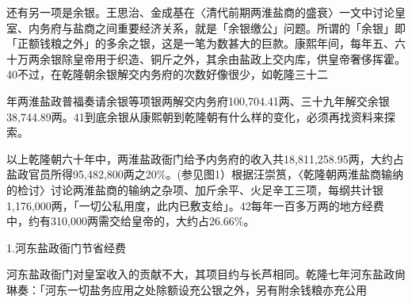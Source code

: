 还有另一项是余银。王思治、金成基在〈清代前期两淮盐商的盛衰〉一文中讨论皇室、内务府与盐商之间重要经济关系，就是「余银缴公」问题。所谓的「余银」即「正额钱粮之外」的多余之银，这是一笔为数甚大的巨款。康熙年间，每年五、六十万两余银除皇帝用于织造、铜斤之外，其余由盐政上交内库，供皇帝奢侈挥霍。40不过，在乾隆朝余银解交内务府的次数好像很少，如乾隆三十二

\vfill
\begin{BookNotes}
\end{BookNotes}

\noindent 年两淮盐政普福奏请余银等项银两解交内务府100,704.41两、三十九年解交余银38,744.89两。41到底余银从康熙朝到乾隆朝有什么样的变化，必须再找资料来探索。

以上乾隆朝六十年中，两淮盐政衙门给予内务府的收入共18,811,258.95两，大约占盐政官员所得95,482,800两之20\%。(参见图1）根据汪崇筼，〈乾隆朝两淮盐商输纳的检讨〉讨论两淮盐商的输纳之杂项、加斤余平、火足辛工三项，每纲共计银1,176,000两，「一切公私用度，此内已敷支给」。42每年一百多万两的地方经费中，约有310,000两需交给皇帝的，大约占26.66\%。



1.河东盐政衙门节省经费

河东盐政衙门对皇室收入的贡献不大，其项目约与长芦相同。乾隆七年河东盐政尙琳奏：「河东一切盐务应用之处除额设充公银之外，另有附余钱粮亦充公用

\vfill
\begin{BookNotes}
\end{BookNotes}

